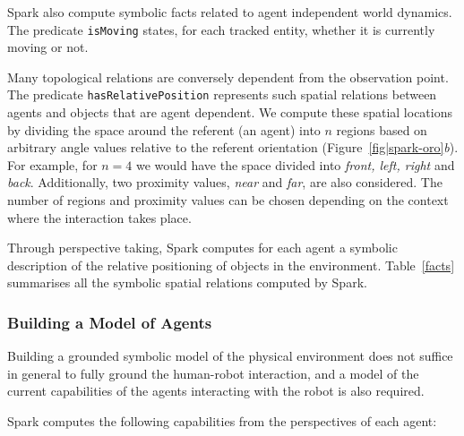 \documentclass[preprint,3p,times]{elsarticle}
\newcommand{\concept}[1]{{\small \texttt{#1}}}
\begin{document}
{\sc Spark} also compute symbolic facts related to agent independent world dynamics.
The predicate \concept{isMoving} states, for each tracked entity, whether it is
currently moving or not.

Many topological relations are conversely dependent from the observation point.
The predicate \concept{hasRelativePosition} represents such spatial relations
between agents and objects that are agent dependent.  We compute these spatial
locations by dividing the space around the referent (an agent) into $n$ regions
based on arbitrary angle values relative to the referent orientation
(Figure~\ref{fig|spark-oro}\emph{b}).  For
example, for $n = 4$ we would have the space divided into \emph{front, left,
right} and \emph{back}. Additionally, two proximity values, \emph{near} and
\emph{far}, are also considered. The number of regions and proximity values can
be chosen depending on the context where the interaction takes place.

Through perspective taking, {\sc Spark} computes for each agent a symbolic
description of the relative positioning of objects in the environment.
Table~\ref{facts} summarises all the symbolic spatial relations computed by {\sc
Spark}.

\subsubsection{Building a Model of Agents}
\label{sect|grounding_agents}

Building a grounded symbolic model of the physical environment does not suffice
in general to fully ground the human-robot interaction, and a model of the
current capabilities of the agents interacting with the robot is also required.

{\sc Spark} computes the following capabilities from the perspectives of each agent:
\end{document}
